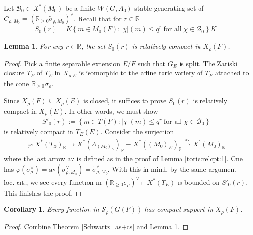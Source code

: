 \documentclass[10pt]{amsart}
\newtheorem{corollary}{Corollary}[theorem]
\newtheorem{lemma}[theorem]{Lemma}
\theoremstyle{definition}
\numberwithin{equation}{section}
\numberwithin{equation}{subsection}
\newcommand{\RR}{\mathbb{R}}
\newcommand{\QQ}{\mathbb{Q}}
\newcommand{\calB}{\mathcal{B}}
\begin{document}
Let $\calB_0\subset X^\ast(M_0)$ be a finite $W(G,A_0)$-stable generating set of  $\overline{C}_{\rho,M_0}= (\mathbb{R}_{\geq0}\widetilde{\sigma}_{\rho,M_0})^\vee$. Recall that for $r\in \RR$
\begin{align*}
     S_0(r)=K\left\{ m\in M_0(F): |\chi|(m)\le q^r \textrm{ for all } \chi\in \calB_0\right\}K.
\end{align*}
\begin{lemma}\label{lem:bounded}
    For any $r\in\RR$, the set $S_0(r)$ is relatively compact in $X_\rho(F)$. 
\end{lemma}
\begin{proof} %
Pick a finite separable extension $E/F$ such that $G_E$ is split. The Zariski closure $\overline{T}_E$ of $T_E$ in $X_{\rho,E}$ is isomorphic to the affine toric variety of $T_E$ attached to the cone $\RR_{\geq 0}\sigma_{\rho}$.


Since $X_{\rho}(F)\subseteq X_{\rho}(E)$ is closed, it suffices to prove $S_0(r)$ is relatively compact in $X_{\rho}(E)$. In other words, we must show
\begin{align*}
    S'_0(r):=\left\{ m\in T(F): |\chi|(m)\le q^r \textrm{ for all } \chi\in \calB_0\right\}
\end{align*}
is relatively compact in $\overline{T}_E(E)$. Consider the surjection
\begin{align*}
    \varphi:X^*(T_E)_\RR \longrightarrow X^*(A_{(M_0)_E})_\RR = X^*((M_{0})_E)_\RR \stackrel{\mathrm{av}}{\longrightarrow}X^*(M_0)_\RR
\end{align*}
where the last arrow $\mathrm{av}$ is defined as in the proof of \hyperref[toric:relcpt:1]{Lemma \ref{toric:relcpt:1}}. One has $\varphi(\sigma_\rho^\vee) = \mathrm{av}(\sigma_{\rho,M_0}^\vee) = \widetilde{\sigma}_{\rho,M_0}^\vee$. With this in mind, by the same argument loc. cit., we see every function in $(\mathbb{R}_{\geq 0}\sigma_{\rho})^\vee\cap X^*(T_E)$ is bounded on $S'_0(r)$.  This finishes the proof.


\end{proof}

\begin{corollary}\label{cor:compactsupport} Every function in $\mathcal{S}_\rho(G(F))$ has compact support in $X_\rho(F)$.
\end{corollary}
\begin{proof} Combine \hyperref[Schwartz=as+cs]{Theorem \ref{Schwartz=as+cs}} and \hyperref[lem:bounded]{Lemma \ref{lem:bounded}}.
\end{proof}
\end{document}
